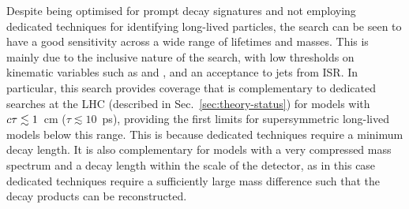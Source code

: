 Despite being optimised for prompt decay signatures and not employing dedicated 
techniques for identifying long-lived particles, the search can be seen to have 
a good sensitivity across a wide range of lifetimes and masses. This is mainly 
due to the inclusive nature of the search, with low thresholds on kinematic 
variables such as \scalht and \njet, and an acceptance to jets from ISR.
In particular, this search provides coverage that is complementary to dedicated 
searches at the LHC (described in Sec.~\ref{sec:theory-status}) for models with 
$c\tau \lesssim 1$~cm ($\tau \lesssim 10$~ps), providing the first limits for 
supersymmetric long-lived models below this range. This is because dedicated 
techniques require a minimum decay length. 
It is also complementary for models with a very compressed mass spectrum and a 
decay length within the scale of the detector, as in this case dedicated 
techniques require a sufficiently large mass difference such that the decay 
products can be reconstructed.



